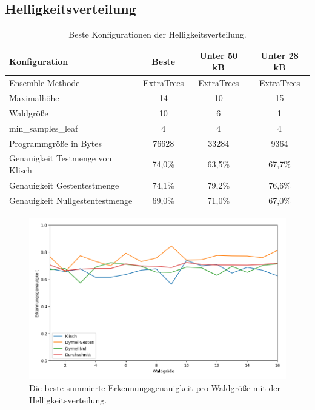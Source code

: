 \subsection{Helligkeitsverteilung}
\begin{table}[h!]
    \centering
    \begin{tabular}{ | l | c | c | c |}
        \hline
        Konfiguration & Beste & Unter 50 kB & Unter 28 kB \\\hline
        Ensemble-Methode & ExtraTrees & ExtraTrees & ExtraTrees \\\hline
        Maximalhöhe & 14 & 10 & 15 \\\hline
        Waldgröße & 10 & 6 & 1 \\\hline
        min\_samples\_leaf & 4 & 4 & 4 \\\hline
        Programmgröße in Bytes & 76628 & 33284 & 9364 \\\hline
        Genauigkeit Testmenge von Klisch & 74,0\% & 63,5\% & 67,7\% \\\hline
        Genauigkeit Gestentestmenge & 74,1\% & 79,2\% & 76,6\% \\\hline
        Genauigkeit Nullgestentestmenge & 69,0\% & 71,0\% & 67,0\% \\\hline
    \end{tabular}
    \caption{Beste Konfigurationen der Helligkeitsverteilung.}
    \label{tab:helligkeitsverteilung}
\end{table}
\begin{figure}[h!]
    \centering
    \includegraphics[width=\linewidth]{images/helligkeitsverteilung_acc_per_size.png}
    \caption{Die beste summierte Erkennungsgenauigkeit pro Waldgröße mit der Helligkeitsverteilung.}
    \label{fig:helligkeitsverteilung_per_forest_size}
\end{figure}
